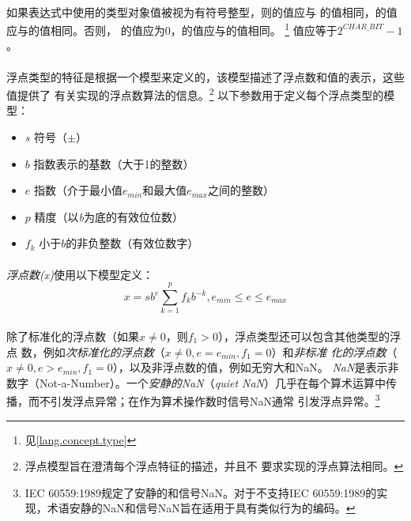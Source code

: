 \paragraph{}
如果表达式中使用的类型对象值被视为有符号整型，则的值应与
的值相同，的值应与的值相同。否则，
的值应为0，的值应与的值相同。
\footnote{见\ref{lang.concept.type}} 值应等于$2^{CHAR\_BIT}-1$。


\paragraph{}
浮点类型的特征是根据一个模型来定义的，该模型描述了浮点数和值的表示，这些值提供了
有关实现的浮点数算法的信息。\footnote{浮点模型旨在澄清每个浮点特征的描述，并且不
要求实现的浮点算法相同。} 以下参数用于定义每个浮点类型的模型：
\begin{itemize}
  \item[]{$s$   \qquad 符号（$\pm$）}
  \item[]{$b$   \qquad 指数表示的基数（大于1的整数）}
  \item[]{$e$   \qquad 指数（介于最小值$e_{min}$和最大值$e_{max}$之间的整数）}
  \item[]{$p$   \qquad 精度（以\textit{b}为底的有效位位数）}
  \item[]{$f_k$ \qquad 小于$b$的非负整数（有效位数字）}
\end{itemize}

\paragraph{}
\textit{浮点数(x)}使用以下模型定义：
\begin{equation*}
  x = sb^e\sum_{k=1}^p f_k b^{-k}, e_{min} \le e \le e_{max}
\end{equation*}

\paragraph{}
除了标准化的浮点数（如果$x\neq0$，则$f_1>0$），浮点类型还可以包含其他类型的浮点
数，例如\textit{次标准化的浮点数}（$x\neq0,e=e_{min},f_1=0$）和\textit{非标准
化的浮点数}（$x\neq0,e>e_{min},f_1=0$），以及非浮点数的值，例如无穷大和NaN。
\textit{NaN}是表示非数字（Not-a-Number）。一个\textit{安静的NaN}（\textit{quiet
NaN}）几乎在每个算术运算中传播，而不引发浮点异常；在作为算术操作数时信号NaN通常
引发浮点异常。\footnote{IEC 60559:1989规定了安静的和信号NaN。对于不支持IEC
60559:1989的实现，术语安静的NaN和信号NaN旨在适用于具有类似行为的编码。}

